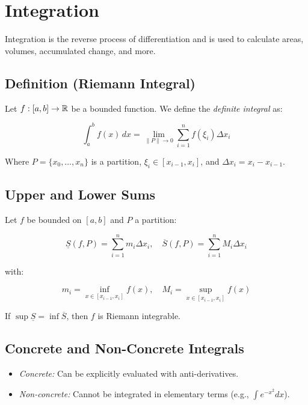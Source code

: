 \newpage
\section{Integration}

Integration is the reverse process of differentiation and is used to calculate areas, volumes, 
accumulated change, and more.

\subsection{Definition (Riemann Integral)}

Let \(f: [a, b] \to \mathbb{R}\) be a bounded function. We define the \emph{definite integral} as:

\[
    \int_a^b f(x)\,dx = \lim_{\|P\| \to 0} \sum_{i=1}^n f(\xi_i)\Delta x_i
\]

Where \(P = \{x_0, \dots, x_n\}\) is a partition, \(\xi_i \in [x_{i-1}, x_i]\), and 
\(\Delta x_i = x_i - x_{i-1}\).

\subsection{Upper and Lower Sums}

Let \(f\) be bounded on \([a, b]\) and \(P\) a partition:

\[
    \underline{S}(f, P) = \sum_{i=1}^n m_i \Delta x_i, \quad
    \overline{S}(f, P) = \sum_{i=1}^n M_i \Delta x_i
\]

with:

\[
    m_i = \inf_{x \in [x_{i-1}, x_i]} f(x), \quad
    M_i = \sup_{x \in [x_{i-1}, x_i]} f(x)
\]

If \(\sup \underline{S} = \inf \overline{S}\), then \(f\) is Riemann integrable.

\subsection{Concrete and Non-Concrete Integrals}

\begin{itemize}

    \item \emph{Concrete:} Can be explicitly evaluated with anti-derivatives.

    \item \emph{Non-concrete:} Cannot be integrated in elementary terms (e.g., \(\int e^{-x^2} dx\)).

\end{itemize}

